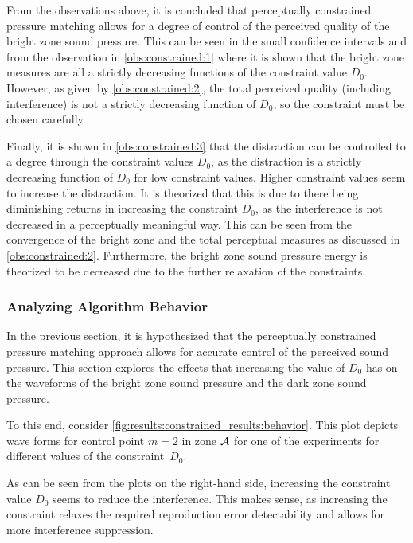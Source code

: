 From the observations above, it is concluded that perceptually constrained pressure matching allows
for a degree of control of the perceived quality of the bright zone sound pressure.
This can be seen in the small confidence intervals and 
from the observation in \autoref{obs:constrained:1} where it is shown that the bright zone measures are 
all a strictly decreasing functions of the constraint value $D_0$. 
However, as given by \autoref{obs:constrained:2}, the total perceived quality (including interference) is 
not a strictly decreasing function of $D_0$, so the constraint must be chosen carefully.

Finally, it is shown in \autoref{obs:constrained:3} that the distraction can be controlled to a degree through the constraint values $D_0$, as the distraction is a strictly decreasing function of $D_0$ for low constraint values. 
Higher constraint values seem to increase the distraction.
It is theorized that this is due to there being diminishing returns in increasing the constraint $D_0$, as the interference is not decreased in a perceptually meaningful way.
This can be seen from the convergence of the bright zone and the total perceptual measures as discussed in 
\autoref{obs:constrained:2}.
Furthermore, the bright zone sound pressure energy is theorized to be decreased due to the further 
relaxation of the constraints.

\subsubsection*{Analyzing Algorithm Behavior}

In the previous section, it is hypothesized that the perceptually constrained pressure matching approach 
allows for accurate control of the perceived sound pressure.
This section explores the effects that increasing the value of $D_0$ has on the waveforms of the 
bright zone sound pressure and the dark zone sound pressure.

To this end, consider \autoref{fig:results:constrained_results:behavior}.
This plot depicts wave forms for control point $m=2$ in zone $\mathcal{A}$ for one of the experiments for different values 
of the constraint~$D_0$.

As can be seen from the plots on the right-hand side,
increasing the constraint value $D_0$ seems to reduce the interference.
This makes sense, as increasing the constraint relaxes the required reproduction error detectability and allows for more interference suppression.

